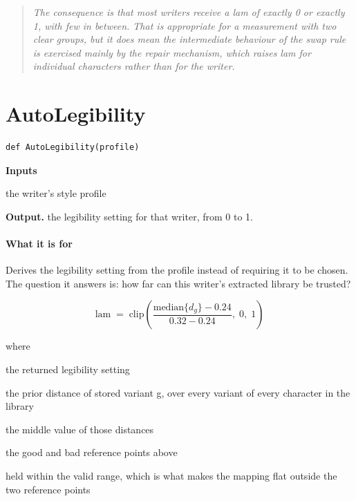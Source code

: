\begin{quote}\small\itshape The consequence is that most writers receive a lam of exactly 0 or exactly 1, with few in between. That is appropriate for a measurement with two clear groups, but it does mean the intermediate behaviour of the swap rule is exercised mainly by the repair mechanism, which raises lam for individual characters rather than for the writer.\end{quote}

\section{AutoLegibility}
\begin{lstlisting}[style=sig]
def AutoLegibility(profile)
\end{lstlisting}

\noindent\textbf{Inputs}
\begin{description}[leftmargin=2.2em,style=nextline,font=\normalfont\ttfamily]\setlength\itemsep{1pt}
  \item[{profile}] \normalfont the writer's style profile
\end{description}

\noindent\textbf{Output.} the legibility setting for that writer, from 0 to 1.


\paragraph{What it is for}
Derives the legibility setting from the profile instead of requiring it to be chosen. The question it answers is: how far can this writer's extracted library be trusted?


\begin{equation}
\mathrm{lam} \;=\; \mathrm{clip}\!\left( \frac{\mathrm{median}\{d_g\} - 0.24}{0.32 - 0.24},\; 0,\; 1\right)
\end{equation}

\noindent where
\begin{description}[leftmargin=2.4em,style=nextline,font=\normalfont\ttfamily]\setlength\itemsep{1pt}
  \item[{$\mathrm{lam}$}] \normalfont the returned legibility setting
  \item[{$d_g$}] \normalfont the prior distance of stored variant g, over every variant of every character in the library
  \item[{$\mathrm{median}$}] \normalfont the middle value of those distances
  \item[{$0.24,\;0.32$}] \normalfont the good and bad reference points above
  \item[{$\mathrm{clip}(\cdot,0,1)$}] \normalfont held within the valid range, which is what makes the mapping flat outside the two reference points
\end{description}

